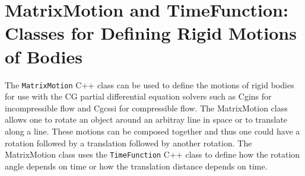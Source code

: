% 
% 
% 
% 
% 
% 
% 
% 
% 

\section{MatrixMotion and TimeFunction: Classes for Defining Rigid Motions of Bodies}\label{sec:matrixMotion}


   The {\tt MatrixMotion} C++ class can be used to define the motions of rigid bodies for use with the
CG partial differential equation solvers such as Cgins for incompressible flow and Cgcssi for compressible flow. 
The MatrixMotion class allows one to rotate an object around an arbitray line in space 
or to translate along a line. These motions can be composed together and thus one could
have a rotation followed by a translation followed by another rotation. The MatrixMotion
class uses the {\tt TimeFunction} C++ class to define how the rotation angle depends on time or how
the translation distance depends on time. 

